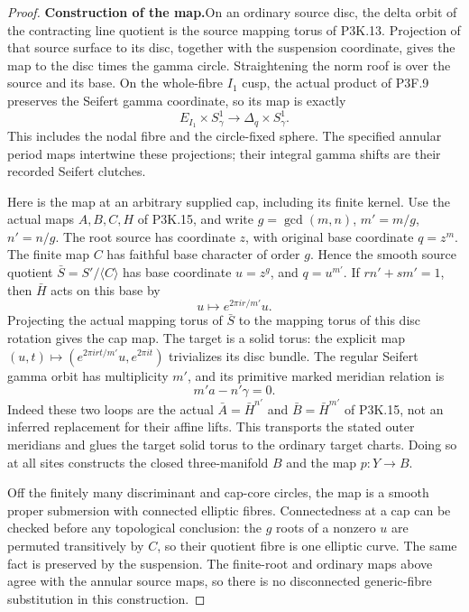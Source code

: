\begin{proof}
\par\medskip\noindent\textbf{Construction of the map.}\enspace On an ordinary source disc,
the delta orbit of the contracting line quotient is the source
mapping torus of P3K.13.  Projection of that source surface to
its disc, together with the suspension coordinate, gives the
map to the disc times the gamma circle.  Straightening the norm
roof is over the source and its base.  On the whole-fibre \(I_1\)
cusp, the actual product of P3F.9 preserves the Seifert gamma
coordinate, so its map is exactly
\[
       E_{I_1}\times S^1_\gamma\longrightarrow
                    \Delta_q\times S^1_\gamma.
\]
This includes the nodal fibre and the circle-fixed sphere.
The specified annular period maps intertwine these projections;
their integral gamma shifts are their recorded Seifert clutches.

Here is the map at an arbitrary supplied cap, including its
finite kernel.  Use the actual maps \(A,B,C,H\) of P3K.15,
and write \(g=\gcd(m,n)\), \(m'=m/g\), \(n'=n/g\).
The root source has coordinate \(z\), with original base
coordinate \(q=z^m\).  The finite map \(C\) has faithful
base character of order \(g\).  Hence the smooth source
quotient \(\bar S=S'/\langle C\rangle\) has base coordinate
\(u=z^g\), and \(q=u^{m'}\).  If
\(rn'+sm'=1\), then \(\bar H\) acts on this base by
\[
                 u\longmapsto e^{2\pi i r/m'}u.
\]
Projecting the actual mapping torus of \(\bar S\) to the
mapping torus of this disc rotation gives the cap map.
The target is a solid torus: the explicit map
\((u,t)\mapsto(e^{2\pi i rt/m'}u,e^{2\pi it})\)
trivializes its disc bundle.  The regular Seifert gamma orbit
has multiplicity \(m'\), and its primitive marked meridian
relation is
\[
                     m'a-n'\gamma=0.             \tag{P3K.16.2}
\]
Indeed these two loops are the actual \(\bar A=\bar H^{n'}\)
and \(\bar B=\bar H^{m'}\) of P3K.15, not an inferred
replacement for their affine lifts.  This transports the stated
outer meridians and glues the target solid torus to the ordinary
target charts.  Doing so at all sites constructs the closed
three-manifold \(B\) and the map \(p:Y\to B\).

Off the finitely many discriminant and cap-core circles, the
map is a smooth proper submersion with connected elliptic
fibres.  Connectedness at a cap can be checked before any
topological conclusion: the \(g\) roots of a nonzero \(u\)
are permuted transitively by \(C\), so their quotient fibre
is one elliptic curve.  The same fact is preserved by the
suspension.  The finite-root and ordinary maps above agree
with the annular source maps, so there is no disconnected
generic-fibre substitution in this construction.


\end{proof}
